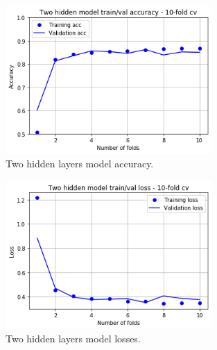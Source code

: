 \begin{figure}
\centering
\includegraphics[width=0.7\textwidth]{./TeX_files/img/twohiddenmodelacc.png}
\caption{Two hidden layers model accuracy.}
\label{fig:twohiddenmodelacc}
\end{figure}

\begin{figure}
\centering
\includegraphics[width=0.7\textwidth]{./TeX_files/img/twohiddenmodelloss.png}
\caption{Two hidden layers model losses.}
\label{fig:twohiddenmodelloss}
\end{figure}

